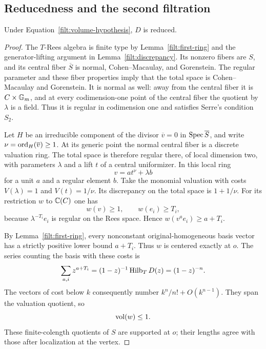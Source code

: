\subsection{Reducedness and the second filtration}

\begin{lemma}\label{filt:reduced}
Under Equation~\eqref{filt:volume-hypothesis}, $D$ is reduced.
\end{lemma}

\begin{proof}
The $T$-Rees algebra is finite type by Lemma~\ref{filt:first-ring} and
the generator-lifting argument in Lemma~\ref{filt:discrepancy}.
Its nonzero fibers are $S$, and its central fiber $\overline S$ is
normal, Cohen--Macaulay, and Gorenstein.  The regular parameter and these
fiber properties imply that the total space is Cohen--Macaulay and
Gorenstein.  It is normal as well: away from the central fiber it is
$C\times\mathbb G_m$, and at every codimension-one point of the central fiber
the quotient by $\lambda$ is a field.  Thus it is regular in codimension
one and satisfies Serre's condition $S_2$.

Let $H$ be an irreducible component of the divisor $\overline v=0$ in
$\operatorname{Spec}\overline S$, and write
$\nu=\operatorname{ord}_H(\overline v)\geq1$.  At its generic point the normal central
fiber is a discrete valuation ring.  The total space is therefore
regular there, of local dimension two, with parameters $\lambda$ and a
lift $t$ of a central uniformizer.  In this local ring
\[
 v=a t^{\nu}+\lambda b
\]
for a unit $a$ and a regular element $b$.  Take the monomial valuation
with costs $V(\lambda)=1$ and $V(t)=1/\nu$.  Its discrepancy on the
total space is $1+1/\nu$.  For its restriction $w$ to $\mathbb C(C)$ one has
\[
 w(v)\geq1,\qquad w(e_i)\geq T_i,
\]
because $\lambda^{-T_i}e_i$ is regular on the Rees space.  Hence
$w(v^ae_i)\geq a+T_i$.

By Lemma~\ref{filt:first-ring}, every nonconstant original-homogeneous
basis vector has a strictly positive lower bound $a+T_i$.  Thus $w$ is
centered exactly at $o$.  The series counting the basis with these
costs is
\[
 \sum_{a,i}z^{a+T_i}=(1-z)^{-1}\operatorname{Hilb}_TD(z)=(1-z)^{-n}.
\]
The vectors of cost below $k$ consequently number
$k^n/n!+O(k^{n-1})$.  They span the valuation quotient, so
\begin{equation}\label{filt:first-volume}
 \operatorname{vol}(w)\leq1.
\end{equation}
These finite-colength quotients of $S$ are supported at $o$; their
lengths agree with those after localization at the vertex.


\end{proof}
